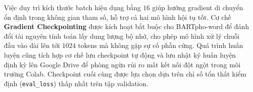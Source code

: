 Việc duy trì kích thước batch hiệu dụng bằng $16$ giúp hướng gradient di chuyển ổn định trong không gian tham số, hỗ trợ cả hai mô hình hội tụ tốt. Cơ chế \textbf{Gradient Checkpointing} được kích hoạt bắt buộc cho BARTpho-word để đánh đổi tài nguyên tính toán lấy dung lượng bộ nhớ, cho phép mô hình xử lý chuỗi đầu vào dài lên tới $1024$ tokens mà không gặp sự cố phần cứng. Quá trình huấn luyện cũng tích hợp cơ chế lưu checkpoint tự động và lưu nhật ký huấn luyện định kỳ lên Google Drive để phòng ngừa rủi ro mất kết nối đột ngột trong môi trường Colab. Checkpoint cuối cùng được lựa chọn dựa trên chỉ số tổn thất kiểm định (\texttt{eval\_loss}) thấp nhất trên tập validation.